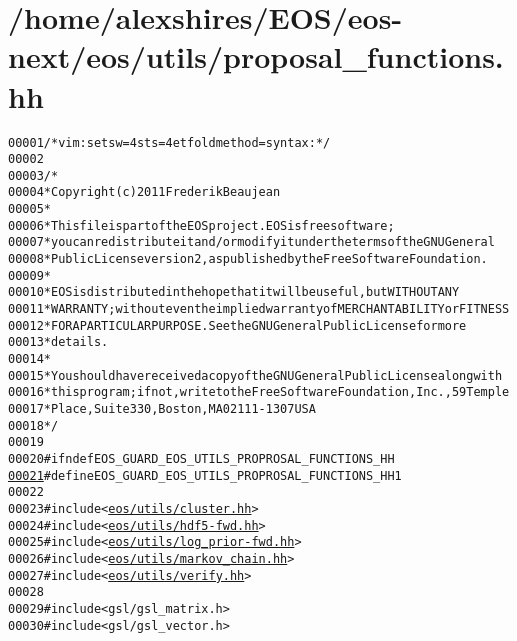 \hypertarget{proposal__functions_8hh_source}{
\section{/home/alexshires/EOS/eos-\/next/eos/utils/proposal\_\-functions.hh}
}


\begin{footnotesize}\begin{alltt}
00001 \textcolor{comment}{/* vim: set sw=4 sts=4 et foldmethod=syntax : */}
00002 
00003 \textcolor{comment}{/*}
00004 \textcolor{comment}{ * Copyright (c) 2011 Frederik Beaujean}
00005 \textcolor{comment}{ *}
00006 \textcolor{comment}{ * This file is part of the EOS project. EOS is free software;}
00007 \textcolor{comment}{ * you can redistribute it and/or modify it under the terms of the GNU General}
00008 \textcolor{comment}{ * Public License version 2, as published by the Free Software Foundation.}
00009 \textcolor{comment}{ *}
00010 \textcolor{comment}{ * EOS is distributed in the hope that it will be useful, but WITHOUT ANY}
00011 \textcolor{comment}{ * WARRANTY; without even the implied warranty of MERCHANTABILITY or FITNESS}
00012 \textcolor{comment}{ * FOR A PARTICULAR PURPOSE.  See the GNU General Public License for more}
00013 \textcolor{comment}{ * details.}
00014 \textcolor{comment}{ *}
00015 \textcolor{comment}{ * You should have received a copy of the GNU General Public License along with}
00016 \textcolor{comment}{ * this program; if not, write to the Free Software Foundation, Inc., 59 Temple}
00017 \textcolor{comment}{ * Place, Suite 330, Boston, MA  02111-1307  USA}
00018 \textcolor{comment}{ */}
00019 
00020 \textcolor{preprocessor}{#ifndef EOS\_GUARD\_EOS\_UTILS\_PROPROSAL\_FUNCTIONS\_HH}
\hypertarget{proposal__functions_8hh_source_l00021}{}\hyperlink{proposal__functions_8hh_adcf0d7fb0622fd69103980900bf5dfc9}{00021} \textcolor{preprocessor}{}\textcolor{preprocessor}{#define EOS\_GUARD\_EOS\_UTILS\_PROPROSAL\_FUNCTIONS\_HH 1}
00022 \textcolor{preprocessor}{}
00023 \textcolor{preprocessor}{#include <\hyperlink{cluster_8hh}{eos/utils/cluster.hh}>}
00024 \textcolor{preprocessor}{#include <\hyperlink{hdf5-fwd_8hh}{eos/utils/hdf5-fwd.hh}>}
00025 \textcolor{preprocessor}{#include <\hyperlink{log__prior-fwd_8hh}{eos/utils/log_prior-fwd.hh}>}
00026 \textcolor{preprocessor}{#include <\hyperlink{markov__chain_8hh}{eos/utils/markov_chain.hh}>}
00027 \textcolor{preprocessor}{#include <\hyperlink{verify_8hh}{eos/utils/verify.hh}>}
00028 
00029 \textcolor{preprocessor}{#include <gsl/gsl\_matrix.h>}
00030 \textcolor{preprocessor}{#include <gsl/gsl\_vector.h>}

\end{alltt}
\end{footnotesize}
